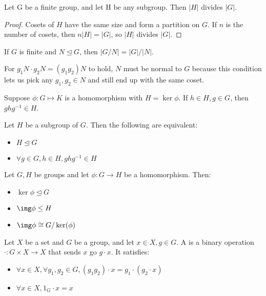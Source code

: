 \documentclass{article}
\begin{document}
\begin{nthm}
  Let G be a finite group, and let H be any subgroup. Then $|H|$ divides $|G|$. 
\end{nthm}
\begin{proof}
  Cosets of $H$ have the same size and form a partition on $G$. If $n$ is the number
  of cosets, then $n|H| = |G|$, so $|H|$ divides $|G|$. 
\end{proof}
\begin{remark}
  If $G$ is finite and $N \trianglelefteq G$, then $|G/N| = |G|/|N|$. 
\end{remark}
\begin{remark}
  For $g_1N \cdot g_2N = (g_1g_2)N$ to hold, $N$ must be normal to $G$ because
  this condition lets us pick any $g_1, g_2 \in N$ and still end up with the
  same coset. 
\end{remark}

\begin{prop}
  Suppose $\phi : G \mapsto K$ is a homomorphism with $H = \ker \phi$. If
  $h \in H, g \in G$, then $ghg^{-1} \in H$. 
\end{prop}

\begin{nthm}
  Let $H$ be a subgroup of $G$. Then the following are equivalent:
  \begin{itemize}
  \item $H \trianglelefteq G$
  \item $\forall g \in G, h \in H, ghg^{-1} \in H$
  \end{itemize}
\end{nthm}

\begin{nthm}
  Let $G, H$ be groups and let $\phi : G \rightarrow H$ be a homomorphism. Then:
  \begin{itemize}
  \item $\ker \phi \trianglelefteq G$
  \item $\img \phi \leq H$
  \item $\img \phi \cong G / \ker(\phi)$
  \end{itemize}
\end{nthm}

\begin{defn}
  Let $X$ be a set and $G$ be a group, and let $x \in X, g \in G$. A 
  is a binary operation $\cdot : G \times X \rightarrow X$ that sends $x$ go $g \cdot x$.
  It satisfies:
  \begin{itemize}
  \item $\forall x \in X, \forall g_1, g_2 \in G, (g_1g_2) \cdot x = g_1 \cdot (g_2 \cdot x)$
  \item $\forall x \in X, 1_G \cdot x = x$
  \end{itemize}
\end{defn}
\end{document}
